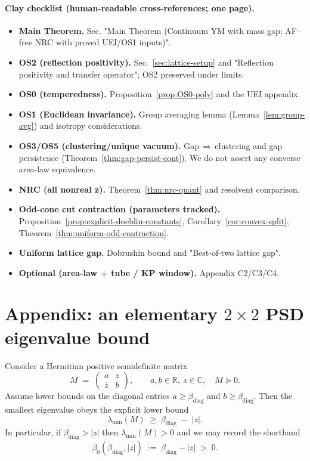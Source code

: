 \documentclass[11pt]{amsart}
\theoremstyle{plain}
\theoremstyle{definition}
\theoremstyle{remark}
\begin{document}
\paragraph{Clay checklist (human-readable cross-references; one page).}
\begin{itemize}
  \item \textbf{Main Theorem.} Sec. "Main Theorem (Continuum YM with mass gap; AF--free NRC with proved UEI/OS1 inputs)".
  \item \textbf{OS2 (reflection positivity).} Sec.~\ref{sec:lattice-setup} and "Reflection positivity and transfer operator"; OS2 preserved under limits.
  \item \textbf{OS0 (temperedness).} Proposition~\ref{prop:OS0-poly} and the UEI appendix.
  \item \textbf{OS1 (Euclidean invariance).} Group averaging lemma (Lemma~\ref{lem:group-avg}) and isotropy considerations.
\item \textbf{OS3/OS5 (clustering/unique vacuum).} Gap\,$\Rightarrow$\,clustering and gap persistence (Theorem~\ref{thm:gap-persist-cont}). We do not assert any converse area-law equivalence.
  \item \textbf{NRC (all nonreal z).} Theorem~\ref{thm:nrc-quant} and resolvent comparison.
  \item \textbf{Odd-cone cut contraction (parameters tracked).} Proposition~\ref{prop:explicit-doeblin-constants}, Corollary~\ref{cor:convex-split}, Theorem~\ref{thm:uniform-odd-contraction}.
  \item \textbf{Uniform lattice gap.} Dobrushin bound and "Best-of-two lattice gap".
  \item \textbf{Optional (area-law + tube / KP window).} Appendix C2/C3/C4.
\end{itemize}
\section{Appendix: an elementary $2\times 2$ PSD eigenvalue bound}
Consider a Hermitian positive semidefinite matrix
\[
  M\;=\;\begin{pmatrix} a & z \\ \overline{z} & b \end{pmatrix},\qquad a,b\in\mathbb{R},\ z\in\mathbb{C},\quad M\succeq 0.
\]
Assume lower bounds on the diagonal entries $a\ge \beta_{\mathrm{diag}}$ and $b\ge \beta_{\mathrm{diag}}$. Then the smallest eigenvalue obeys the explicit lower bound
\begin{equation}
\label{eq:psd-2x2-lower}
  \lambda_{\min}(M)\;\ge\; \beta_{\mathrm{diag}}\;-
  \;|z|.
\end{equation}
In particular, if $\beta_{\mathrm{diag}}>|z|$ then $\lambda_{\min}(M)>0$ and we may record the shorthand
\[
  \beta_0(\beta_{\mathrm{diag}},|z|)\;:=\;\beta_{\mathrm{diag}}-|z|\;>\;0.
\]
\end{document}
